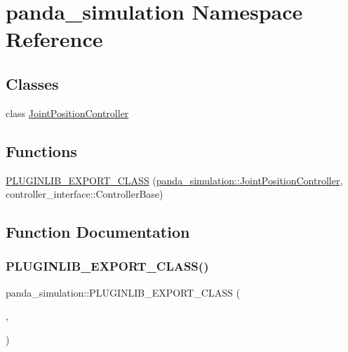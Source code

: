 \hypertarget{namespacepanda__simulation}{}\section{panda\+\_\+simulation Namespace Reference}
\label{namespacepanda__simulation}
\subsection*{Classes}
\begin{DoxyCompactItemize}
\item 
class \hyperlink{classpanda__simulation_1_1JointPositionController}{Joint\+Position\+Controller}
\end{DoxyCompactItemize}
\subsection*{Functions}
\begin{DoxyCompactItemize}
\item 
\hyperlink{namespacepanda__simulation_ab7804aeb37200fadf2643cce0a8ed927}{P\+L\+U\+G\+I\+N\+L\+I\+B\+\_\+\+E\+X\+P\+O\+R\+T\+\_\+\+C\+L\+A\+SS} (\hyperlink{classpanda__simulation_1_1JointPositionController}{panda\+\_\+simulation\+::\+Joint\+Position\+Controller}, controller\+\_\+interface\+::\+Controller\+Base)
\end{DoxyCompactItemize}


\subsection{Function Documentation}
\mbox{\label{namespacepanda__simulation_ab7804aeb37200fadf2643cce0a8ed927}} 
\subsubsection{\texorpdfstring{P\+L\+U\+G\+I\+N\+L\+I\+B\+\_\+\+E\+X\+P\+O\+R\+T\+\_\+\+C\+L\+A\+S\+S()}{PLUGINLIB\_EXPORT\_CLASS()}}
{\footnotesize\ttfamily panda\+\_\+simulation\+::\+P\+L\+U\+G\+I\+N\+L\+I\+B\+\_\+\+E\+X\+P\+O\+R\+T\+\_\+\+C\+L\+A\+SS (\begin{DoxyParamCaption}\item[{\hyperlink{classpanda__simulation_1_1JointPositionController}{panda\+\_\+simulation\+::\+Joint\+Position\+Controller}}]{,  }\item[{controller\+\_\+interface\+::\+Controller\+Base}]{ }\end{DoxyParamCaption})}

